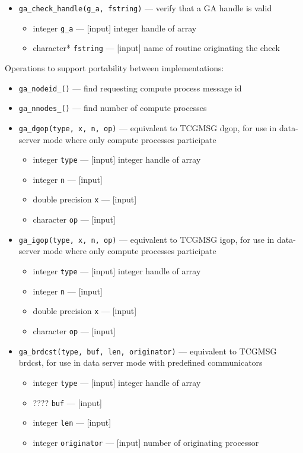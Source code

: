 \begin{itemize}
\item {\tt ga\_check\_handle(g\_a, fstring)} --- verify that a GA handle is valid
\begin{itemize}
\item     integer {\tt g\_a}         --- [input] integer handle of array
\item     character* {\tt fstring}  --- [input] name of routine originating the check
\end{itemize}

\end{itemize}

Operations to support portability between implementations:
\begin{itemize}
\item {\tt ga\_nodeid\_()} --- find requesting compute process message id
\item {\tt ga\_nnodes\_()} --- find number of compute processes
\item {\tt ga\_dgop(type, x, n, op)} --- equivalent to TCGMSG dgop, for use in data-server
mode where only compute processes participate
\begin{itemize}
\item     integer {\tt type}        --- [input] integer handle of array
\item     integer {\tt n}           --- [input]
\item     double precision {\tt x}  --- [input] 
\item     character {\tt op}        --- [input] 
\end{itemize}

\item {\tt ga\_igop(type, x, n, op)} --- equivalent to TCGMSG igop, for use in data-server mode
where only compute processes participate
\begin{itemize}
\item     integer {\tt type}        --- [input] integer handle of array
\item     integer {\tt n}           --- [input]
\item     double precision {\tt x}  --- [input] 
\item     character {\tt op}        --- [input] 
\end{itemize}

\item {\tt ga\_brdcst(type, buf, len, originator)} --- equivalent to TCGMSG brdcst, for use in data server mode
with predefined communicators
\begin{itemize}
\item     integer {\tt type}        --- [input] integer handle of array
\item     ????    {\tt buf}         --- [input]
\item     integer {\tt len}         --- [input]
\item     integer {\tt originator}  --- [input] number of originating processor
\end{itemize}

\end{itemize}

